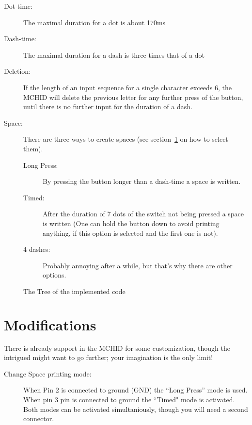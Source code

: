 \documentclass[a5paper,12pt]{article}
\begin{document}
    \begin{description}

        \item[Dot-time:] The maximal duration for a dot is about 170ms
        \item[Dash-time:] The maximal duration for a dash is three times that of a dot
        \item[Deletion:] If the length of an input sequence for a single character exceeds 6, the MCHID will delete the previous letter for any further press of the button, until there is no further input for the duration of a dash.
        \item[Space:] There are three ways to create spaces (see section~\ref{modifications} on how to select them).
            \begin{description}
            \item[Long Press:] By pressing the button longer than a dash-time a space is written.
            \item[Timed:] After the duration of 7 dots of the switch not being pressed a space is written (One can hold the button down to avoid printing anything, if this option is selected and the first one is not).
            \item[4 dashes:] Probably annoying after a while, but that's why there are other options.
            \end{description}
    \end{description}

    \begin{center}
    \label{morseTree}
    \begin{figure}
    
        \caption{The Tree of the implemented code}
        \label{fig:morseTree}
    \end{figure}
    \end{center}
    \section{Modifications}\label{modifications}
    There is already support in the MCHID for some customization, though the intrigued might want to go further; your imagination is the only limit!

    \begin{description}
        \item[Change Space printing mode:] When Pin 2 is connected to ground (GND) the ``Long Press'' mode is used.\\
        When pin 3 pin is connected to ground the ``Timed" mode is activated.\\
        Both modes can be activated simultaniously, though you will need a second connector.
    \end{description}
\end{document}
